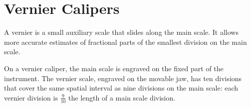 \section{Vernier Calipers}
\label{vernier_caliper}

A vernier is a small auxiliary scale that slides along the main scale. It allows more accurate estimates of fractional parts of the smallest division on the main scale.

On a vernier caliper, the main scale is engraved on the fixed part of the instrument. The vernier scale, engraved on the movable jaw, has ten divisions that cover the same spatial interval as nine divisions on the main scale: each vernier division is $\frac{9}{10}$ the length of a main scale division. 

